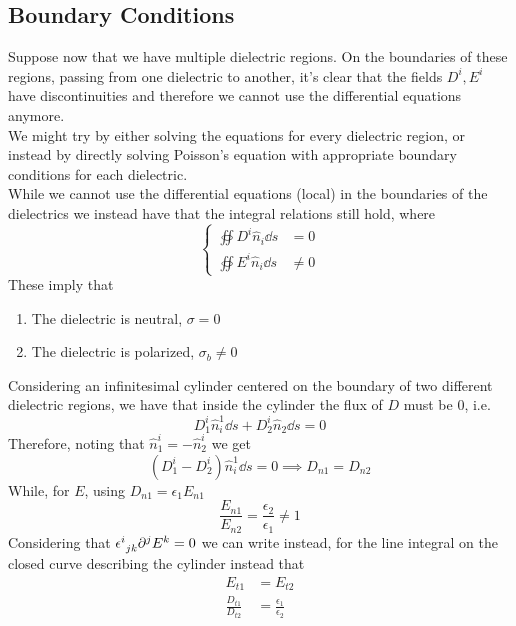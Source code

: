 \documentclass[../electromagnetism]{subfiles}
\begin{document}
\subsection{Boundary Conditions}
Suppose now that we have multiple dielectric regions. On the boundaries of these regions, passing from one dielectric to another, it's clear that the fields $D^i,E^i$ have discontinuities and therefore we cannot use the differential equations anymore.\\
We might try by either solving the equations for every dielectric region, or instead by directly solving Poisson's equation with appropriate boundary conditions for each dielectric.\\
While we cannot use the differential equations (local) in the boundaries of the dielectrics we instead have that the integral relations still hold, where
\begin{equation}
	\left\{ \begin{aligned}
			\oiint D^i\hat{n}_i\dd s&=0\\
			\oiint E^i\hat{n}_i\dd s&\ne0
	\end{aligned}\right.
	\label{eq:integralrelbounddie}
\end{equation}
These imply that
\begin{enumerate}
\item The dielectric is neutral, $\sigma=0$
\item The dielectric is polarized, $\sigma_b\ne0$
\end{enumerate}
Considering an infinitesimal cylinder centered on the boundary of two different dielectric regions, we have that inside the cylinder the flux of $D$ must be 0, i.e.
\begin{equation*}
	D^i_1\hat{n}_i^1\dd s+D^i_2\hat{n}_2\dd s=0
\end{equation*}
Therefore, noting that $\hat{n}_1^i=-\hat{n}^i_2$ we get
\begin{equation}
	\left( D^i_1-D^i_2 \right)\hat{n}_i^1\dd s=0\implies D_{n1}=D_{n2}
	\label{eq:Dboundconddien}
\end{equation}
While, for $E$, using $D_{n1}=\epsilon_1E_{n1}$
\begin{equation}
	\frac{E_{n1}}{E_{n2}}=\frac{\epsilon_2}{\epsilon_1}\ne1
	\label{eq:Eboundconddien}
\end{equation}
Considering that $\epsilon^{i}_{\ jk}\partial^jE^k=0$ we can write instead, for the line integral on the closed curve describing the cylinder instead that
\begin{equation}
	\begin{aligned}
		E_{t1}&=E_{t2}\\
		\frac{D_{t1}}{D_{t2}}&=\frac{\epsilon_1}{\epsilon_2}
	\end{aligned}
	\label{eq:EDboundconddiet}
\end{equation}
\end{document}
